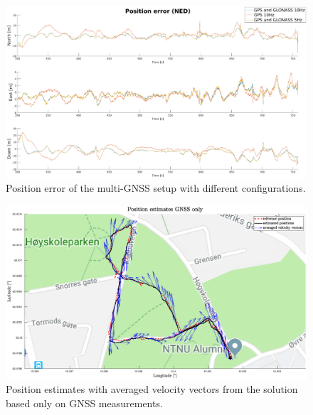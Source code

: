     \begin{figure}
        \hspace{-1.5cm}
        \includegraphics[scale=0.3]{Results/Images/position-err-gnss.eps}
        \caption{Position error of the multi-GNSS setup with different configurations.}
        \label{fig:pos-err-gnss}
    \end{figure}
    
    \begin{figure}[!htbp]
        \hspace{-1.5cm}
        \includegraphics[scale=0.3]{Results/Images/gnss-only-with-vel.eps}
        \caption{Position estimates with averaged velocity vectors from the solution based only on GNSS measurements.}
        \label{fig:gnss-vel-map}
    \end{figure}
    
    
    
